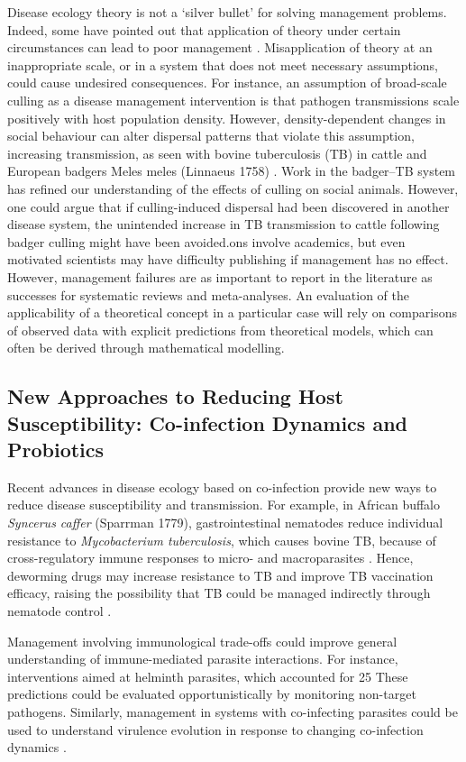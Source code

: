 Disease ecology theory is not a ‘silver bullet’ for solving management problems. Indeed, some have pointed out that application of theory under certain circumstances can lead to poor management \citep{driscoll2012framework}.
Misapplication of theory at an inappropriate scale, or in a system that does not meet necessary assumptions, could cause undesired consequences.
For instance, an assumption of broad-scale culling as a disease management intervention is that pathogen transmissions scale positively with host population density.
However, density-dependent changes in social behaviour can alter dispersal patterns that violate this assumption, increasing transmission, as seen with bovine tuberculosis (TB) in cattle and European badgers Meles meles (Linnaeus 1758) \citep{Woodroffe2006}.
Work in the badger–TB system has refined our understanding of the effects of culling on social animals.
However, one could argue that if culling-induced dispersal had been discovered in another disease system, the unintended increase in TB transmission to cattle following badger culling might have been avoided.ons involve academics, but even motivated scientists may have difficulty publishing if management has no effect.
However, management failures are as important to report in the literature as successes for systematic reviews and meta-analyses.
An evaluation of the applicability of a theoretical concept in a particular case will rely on comparisons of observed data with explicit predictions from theoretical models, which can often be derived through mathematical modelling.

\subsection{New Approaches to Reducing Host Susceptibility: Co-infection Dynamics and Probiotics}

Recent advances in disease ecology based on co-infection provide new ways to reduce disease susceptibility and transmission.
For example, in African buffalo \textit{Syncerus caffer} (Sparrman 1779), gastrointestinal nematodes reduce individual resistance to \textit{Mycobacterium tuberculosis}, which causes bovine TB, because of cross-regulatory immune responses to micro- and macroparasites \citep{Ezenwa2010}.
Hence, deworming drugs may increase resistance to TB and improve TB vaccination efficacy, raising the possibility that TB could be managed indirectly through nematode control \citep{Elias2006, Ezenwa2010}.

Management involving immunological trade-offs could improve general understanding of immune-mediated parasite interactions.
For instance, interventions aimed at helminth parasites, which accounted for 25%
These predictions could be evaluated opportunistically by monitoring non-target pathogens.
Similarly, management in systems with co-infecting parasites could be used to understand virulence evolution in response to changing co-infection dynamics \citep{Alizon2008c}.

